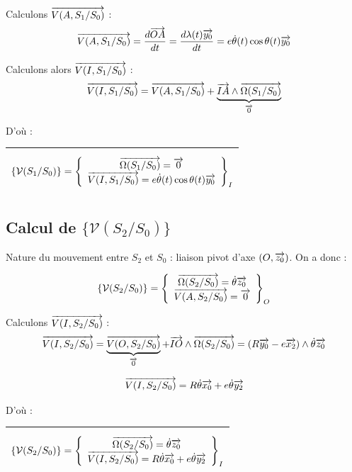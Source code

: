 \documentclass[10pt,oneside]{article}
\begin{document}
Calculons $\overrightarrow{V(A,S_1/S_0)}$ :
$$
\overrightarrow{V(A,S_1/S_0)} = \dfrac{d\overrightarrow{OA}}{dt} = \dfrac{d\lambda(t)\overrightarrow{y_0}}{dt} =  e \dot{\theta}(t) \cos \theta(t) \overrightarrow{y_0}
$$

Calculons alors $\overrightarrow{V(I,S_1/S_0)}$ :
$$
\overrightarrow{V(I,S_1/S_0)} = \overrightarrow{V(A,S_1/S_0)} + \underbrace{\overrightarrow{IA} \wedge \overrightarrow{\Omega(S_1/S_0)}}_{\overrightarrow{0}}
$$

D'où :
\begin{center}
\begin{tabular}{|p{8cm}|}
\hline
$$
\{\mathcal{V}(S_1/S_0)\} =
\left\{
\begin{array}{c}
\overrightarrow{\Omega(S_1/S_0)} = \overrightarrow{0} \\
\overrightarrow{V(I,S_1/S_0)} = e \dot{\theta}(t) \cos \theta(t) \overrightarrow{y_0}  \\
\end{array}
\right\}_I
$$
\\
\hline
\end{tabular}
\end{center}

\subsection*{Calcul de $\{\mathcal{V}(S_2/S_0)\}$}
Nature du mouvement entre $S_2$ et $S_0$ : liaison pivot d'axe $(O,\overrightarrow{z_0})$.
On a donc : 

$$
\{\mathcal{V}(S_2/S_0)\} =
\left\{
\begin{array}{c}
\overrightarrow{\Omega(S_2/S_0)} = \dot{\theta}\overrightarrow{z_0} \\
\overrightarrow{V(A,S_2/S_0)} = \overrightarrow{0} \\
\end{array}
\right\}_O
$$

Calculons $\overrightarrow{V(I,S_2/S_0)}$ :
$$
\overrightarrow{V(I,S_2/S_0)} = 
\underbrace{\overrightarrow{V(O,S_2/S_0)}}_{\overrightarrow{0} }
+ \overrightarrow{IO} \wedge \overrightarrow{\Omega(S_2/S_0)} = \left(R\overrightarrow{y_0}-e\overrightarrow{x_2}\right) \wedge \dot{\theta}\overrightarrow{z_0}
$$

$$
\overrightarrow{V(I,S_2/S_0)} = R\dot{\theta}\overrightarrow{x_0} + e\dot{\theta}\overrightarrow{y_2}
$$

D'où :
\begin{center}
\begin{tabular}{|p{8cm}|}
\hline
$$
\{\mathcal{V}(S_2/S_0)\} =
\left\{
\begin{array}{c}
\overrightarrow{\Omega(S_2/S_0)} = \dot{\theta}\overrightarrow{z_0} \\
\overrightarrow{V(I,S_2/S_0)} = R\dot{\theta}\overrightarrow{x_0} + e\dot{\theta}\overrightarrow{y_2}  \\
\end{array}
\right\}_I
$$ \\
\hline
\end{tabular}
\end{center}
\end{document}
